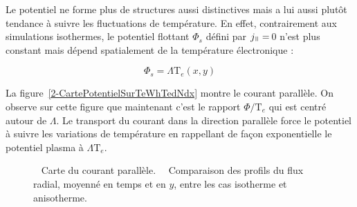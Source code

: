\begin{refsection}
Le potentiel ne forme plus de structures aussi
distinctives mais a lui aussi
plutôt tendance à suivre les fluctuations de température. En effet,
contrairement aux simulations isothermes, le potentiel flottant $\Phi_s$ défini
par $j_\para=\,$0 n'est plus constant mais dépend spatialement de la
température électronique :

\begin{equation}
	\Phi_{s}=\Lambda\text{T}_e(x,y)
\end{equation}

La figure~\ref{2-CartePotentielSurTeWhTedNdx} montre le courant
parallèle. On observe sur cette figure
que maintenant c'est le rapport $\Phi/\text{T}_e$ qui est centré autour de
$\Lambda$. Le transport du courant dans la direction parallèle
force le potentiel à suivre les variations de température en rappellant de
façon exponentielle le potentiel plasma à $\Lambda\text{T}_e$. 

\begin{figure}[!htbp]
\centering
    \caption{~ Carte du courant parallèle.
    ~~Comparaison des profils du flux radial, moyenné en temps et en $y$, entre les cas
    isotherme et anisotherme.}
\end{figure}


\end{refsection}
